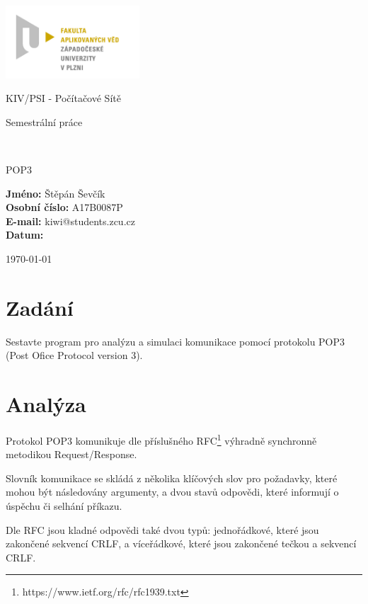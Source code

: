 \documentclass[12pt,a4paper]{article}
\author{Štěpán Ševčík}
\let\oldsection\section
\renewcommand\section{\clearpage\oldsection}
\begin{document}
\begin{titlepage}

\includegraphics[width=50mm]{img/FAV.jpg}
\\[160 pt]
\centerline{ \Large \sc KIV/PSI - Počítačové Sítě}
\centerline{ \large \sc Semestrální práce}
\\[12 pt]
{\large \sc
\centerline{\Huge{POP3}}
}


{
\vfill 
\parindent=0cm
\textbf{Jméno:} Štěpán Ševčík\\
\textbf{Osobní číslo:} A17B0087P\\
\textbf{E-mail:} kiwi@students.zcu.cz\\
\textbf{Datum:} {\large \today\par} %

}

\end{titlepage}

\newpage
\setcounter{page}{2}
\setcounter{tocdepth}{3}
\tableofcontents



\section{Zadání}
Sestavte program pro analýzu a simulaci komunikace pomocí protokolu POP3 (Post Ofice Protocol version 3).


\section{Analýza}
Protokol POP3 komunikuje dle příslušného RFC\footnote{https://www.ietf.org/rfc/rfc1939.txt} výhradně synchronně metodikou Request/Response.

Slovník komunikace se skládá z několika klíčových slov pro požadavky, které mohou být následovány argumenty, a dvou stavů odpovědi, které informují o úspěchu či selhání příkazu.

Dle RFC jsou kladné odpovědi také dvou typů: jednořádkové, které jsou zakončené sekvencí CRLF, a víceřádkové, které jsou zakončené tečkou a sekvencí CRLF.
\end{document}
